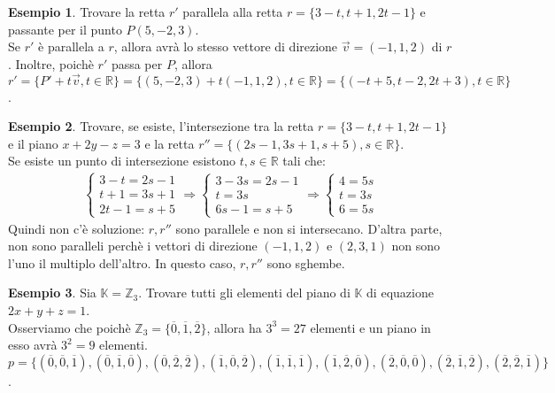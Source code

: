 \documentclass[a4paper]{article}
\theoremstyle{definition}
\newtheorem*{es}{Esempio}
\begin{document}
	\begin{es}
		Trovare la retta $r'$ parallela alla retta $r = \{3 - t, t + 1, 2t - 1\}$ e passante per il punto $P(5, -2, 3)$. \\
		Se $r'$ è parallela a $r$, allora avrà lo stesso vettore di direzione $\overrightarrow{v} = (-1, 1, 2)$ di $r$.
		Inoltre, poichè $r'$ passa per $P$, allora $r' = \{P' + t \overrightarrow{v}, t \in \mathbb{R}\}
		= \{(5, -2, 3) + t(-1, 1, 2), t \in \mathbb{R}\} = \{(-t + 5, t - 2, 2t + 3), t \in \mathbb{R}\}$.
	\end{es}

	\begin{es}
		Trovare, se esiste, l'intersezione tra la retta $r = \{3 - t, t + 1, 2t - 1\}$ e il piano $x + 2y - z = 3$ e la retta
		$r'' = \{(2s - 1, 3s + 1, s + 5), s \in \mathbb{R}\}$. \\
		Se esiste un punto di intersezione esistono $t, s \in \mathbb{R}$ tali che:
		\begin{align*}
			\begin{cases}
				3 - t = 2s - 1 \\
				t + 1 = 3s + 1 \\
				2t - 1 = s + 5
			\end{cases} \Rightarrow \begin{cases}
				3 - 3s = 2s - 1 \\
				t = 3s \\
				6s - 1 = s + 5
			\end{cases} \Rightarrow \begin{cases}
				4 = 5s \\
				t = 3s \\
				6 = 5s
			\end{cases}
		\end{align*}
		Quindi non c'è soluzione: $r, r''$ sono parallele e non si intersecano.
		D'altra parte, non sono paralleli perchè i vettori di direzione $(-1, 1, 2)$ e $(2, 3, 1)$ non sono l'uno il multiplo dell'altro.
		In questo caso, $r, r''$ sono sghembe.
	\end{es}

	\begin{es}
		Sia $\mathbb{K} = \mathbb{Z}_3$. Trovare tutti gli elementi del piano di $\mathbb{K}$ di equazione $2x + y + z = 1$. \\
		Osserviamo che poichè $\mathbb{Z}_3 = \{\overline{0}, \overline{1}, \overline{2}\}$, allora ha $3^3 = 27$ elementi e un piano in esso avrà $3^2 = 9$ elementi.
		$p = \{(\overline{0}, \overline{0}, \overline{1}), (\overline{0}, \overline{1}, \overline{0}), (\overline{0}, \overline{2}, \overline{2}),
		(\overline{1}, \overline{0}, \overline{2}), (\overline{1}, \overline{1}, \overline{1}), (\overline{1}, \overline{2}, \overline{0}),
		(\overline{2}, \overline{0}, \overline{0}), (\overline{2}, \overline{1}, \overline{2}), (\overline{2}, \overline{2}, \overline{1})\}$.
	\end{es}
\end{document}
